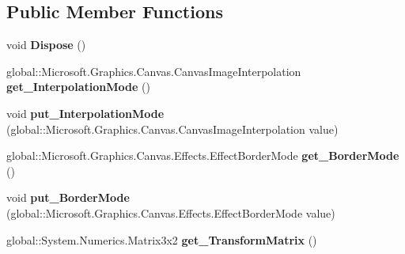 \subsection*{Public Member Functions}
\begin{DoxyCompactItemize}
\item 
\mbox{\label{class_microsoft_1_1_graphics_1_1_canvas_1_1_effects_1_1_transform2_d_effect_ac0a088ca93fab0d1da165143fccc2bf1}} 
void {\bfseries Dispose} ()
\item 
\mbox{\label{class_microsoft_1_1_graphics_1_1_canvas_1_1_effects_1_1_transform2_d_effect_a3e8f7b5eac9642f7b67f3051339ad6e0}} 
global\+::\+Microsoft.\+Graphics.\+Canvas.\+Canvas\+Image\+Interpolation {\bfseries get\+\_\+\+Interpolation\+Mode} ()
\item 
\mbox{\label{class_microsoft_1_1_graphics_1_1_canvas_1_1_effects_1_1_transform2_d_effect_a7f4454ee99f14f9f2a19f8f9a7faf9f5}} 
void {\bfseries put\+\_\+\+Interpolation\+Mode} (global\+::\+Microsoft.\+Graphics.\+Canvas.\+Canvas\+Image\+Interpolation value)
\item 
\mbox{\label{class_microsoft_1_1_graphics_1_1_canvas_1_1_effects_1_1_transform2_d_effect_aba647ac3b58290db44c3c98ca8c19749}} 
global\+::\+Microsoft.\+Graphics.\+Canvas.\+Effects.\+Effect\+Border\+Mode {\bfseries get\+\_\+\+Border\+Mode} ()
\item 
\mbox{\label{class_microsoft_1_1_graphics_1_1_canvas_1_1_effects_1_1_transform2_d_effect_a3c44e6817302d293e5cd76726375a5e1}} 
void {\bfseries put\+\_\+\+Border\+Mode} (global\+::\+Microsoft.\+Graphics.\+Canvas.\+Effects.\+Effect\+Border\+Mode value)
\item 
\mbox{\label{class_microsoft_1_1_graphics_1_1_canvas_1_1_effects_1_1_transform2_d_effect_ac3153a849025ced8b89361d97104772b}} 
global\+::\+System.\+Numerics.\+Matrix3x2 {\bfseries get\+\_\+\+Transform\+Matrix} ()

\end{DoxyCompactItemize}
